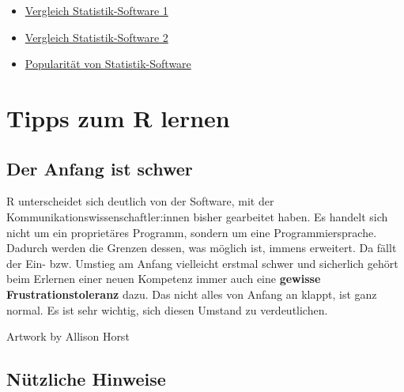 \documentclass[
]{book}
\providecommand{\tightlist}{%
  \setlength{\itemsep}{0pt}\setlength{\parskip}{0pt}}
\begin{document}
\begin{itemize}
\tightlist
\item
  \href{https://www.inwt-statistics.de/blog-artikel-lesen/Statistik-Software-R_Python_SAS_SPSS_STATA_im_Vergleich.html}{Vergleich Statistik-Software 1}
\item
  \href{https://novustat.com/statistik-blog/statistikprogramm-ueberblick.html}{Vergleich Statistik-Software 2}
\item
  \href{http://r4stats.com/articles/popularity/}{Popularität von Statistik-Software}
\end{itemize}

\hypertarget{tipps-zum-r-lernen}{%
\section{Tipps zum R lernen}\label{tipps-zum-r-lernen}}

\hypertarget{der-anfang-ist-schwer}{%
\subsection{Der Anfang ist schwer}\label{der-anfang-ist-schwer}}

R unterscheidet sich deutlich von der Software, mit der Kommunikationswissenschaftler:innen bisher gearbeitet haben. Es handelt sich nicht um ein proprietäres Programm, sondern um eine Programmiersprache. Dadurch werden die Grenzen dessen, was möglich ist, immens erweitert. Da fällt der Ein- bzw. Umstieg am Anfang vielleicht erstmal schwer und sicherlich gehört beim Erlernen einer neuen Kompetenz immer auch eine \textbf{gewisse Frustrationstoleranz} dazu. Das nicht alles von Anfang an klappt, ist ganz normal. Es ist sehr wichtig, sich diesen Umstand zu verdeutlichen.

Artwork by Allison Horst

\hypertarget{nuxfctzliche-hinweise}{%
\subsection{Nützliche Hinweise}\label{nuxfctzliche-hinweise}}
\end{document}
